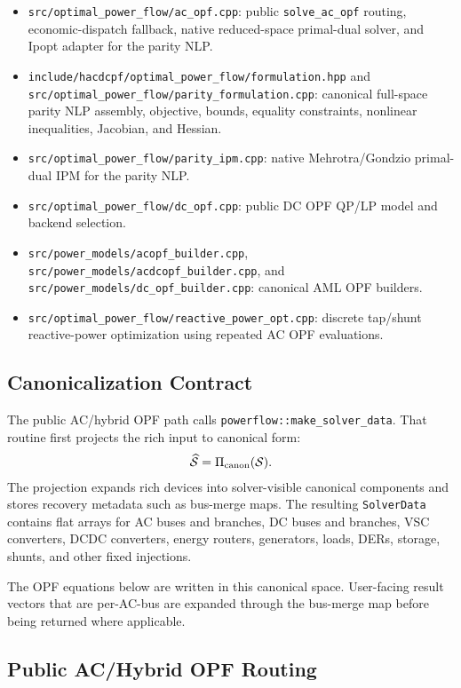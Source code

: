 \begin{itemize}
  \item \texttt{src/optimal\_power\_flow/ac\_opf.cpp}: public
  \texttt{solve\_ac\_opf} routing, economic-dispatch fallback, native
  reduced-space primal-dual solver, and Ipopt adapter for the parity NLP.
  \item \texttt{include/hacdcpf/optimal\_power\_flow/formulation.hpp} and
  \texttt{src/optimal\_power\_flow/parity\_formulation.cpp}: canonical
  full-space parity NLP assembly, objective, bounds, equality constraints,
  nonlinear inequalities, Jacobian, and Hessian.
  \item \texttt{src/optimal\_power\_flow/parity\_ipm.cpp}: native
  Mehrotra/Gondzio primal-dual IPM for the parity NLP.
  \item \texttt{src/optimal\_power\_flow/dc\_opf.cpp}: public DC OPF QP/LP
  model and backend selection.
  \item \texttt{src/power\_models/acopf\_builder.cpp},
  \texttt{src/power\_models/acdcopf\_builder.cpp}, and
  \texttt{src/power\_models/dc\_opf\_builder.cpp}: canonical AML OPF builders.
  \item \texttt{src/optimal\_power\_flow/reactive\_power\_opt.cpp}: discrete
  tap/shunt reactive-power optimization using repeated AC OPF evaluations.
\end{itemize}

\subsection{Canonicalization Contract}

The public AC/hybrid OPF path calls \texttt{powerflow::make\_solver\_data}.  That
routine first projects the rich input to canonical form:
\begin{align}
\widehat{\mathcal{S}}=\Pi_{\mathrm{canon}}(\mathcal{S}).
\end{align}
The projection expands rich devices into solver-visible canonical components and
stores recovery metadata such as bus-merge maps.  The resulting
\texttt{SolverData} contains flat arrays for AC buses and branches, DC buses and
branches, VSC converters, DCDC converters, energy routers, generators, loads,
DERs, storage, shunts, and other fixed injections.

The OPF equations below are written in this canonical space.  User-facing result
vectors that are per-AC-bus are expanded through the bus-merge map before being
returned where applicable.

\subsection{Public AC/Hybrid OPF Routing}

